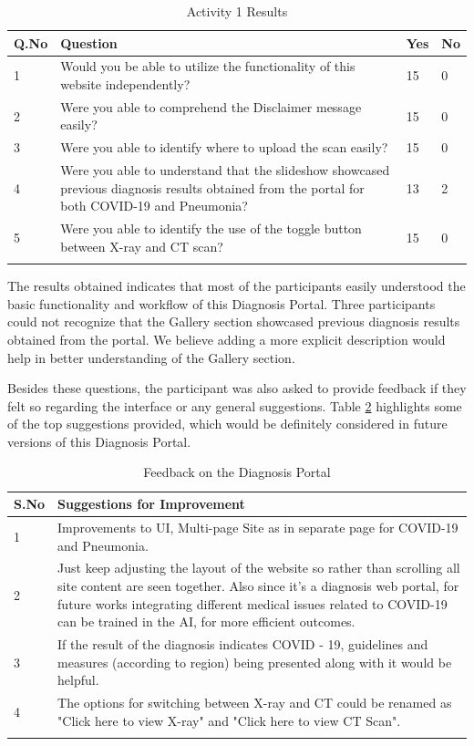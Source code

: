 \begin{longtable}{| p{} | p{} | p{} | p{} |} 
    \hline
    		\textbf{Q.No}    &\textbf{Question} & \textbf{Yes}     & \textbf{No}
\\\hline
            1   &Would you be able to utilize the functionality of this website independently?  &15  &0
\\\hline
            2   &Were you able to comprehend the Disclaimer message easily?  &15  &0
\\\hline
            3   &Were you able to identify where to upload the scan easily?  &15  &0
\\\hline
            4   &Were you able to understand that the slideshow showcased previous diagnosis results obtained from the portal for both COVID-19 and Pneumonia?  &13  &2
\\\hline
            5   &Were you able to identify the use of the toggle button between X-ray and CT scan?  &15  &0
\\\hline

\caption{Activity 1 Results} \label{act:1}
        \end{longtable}

The results obtained indicates that most of the participants easily understood the basic functionality and workflow of this Diagnosis Portal. Three participants could not recognize that the Gallery section showcased previous diagnosis results obtained from the portal. We believe adding a more explicit description would help in better understanding of the Gallery section.

Besides these questions, the participant was also asked to provide feedback if they felt so regarding the interface or any general suggestions. Table \ref{feedback} highlights some of the top suggestions provided, which would be definitely considered in future versions of this Diagnosis Portal.

\vspace{1em}
\begin{longtable}{| p{} | p{} |} 
    \hline
    		\textbf{S.No}    &\textbf{Suggestions for Improvement} 
\\\hline
            1   &Improvements to UI, Multi-page Site as in separate page for COVID-19 and Pneumonia.
\\\hline
            2   &Just keep adjusting the layout of the website so rather than scrolling all site content are seen together. Also since it's a diagnosis web portal, for future works integrating different medical issues related to COVID-19 can be trained in the AI, for more efficient outcomes.
\\\hline
            3   &If the result of the diagnosis indicates COVID - 19, guidelines and measures (according to region) being presented along with it would be helpful.
\\\hline
          4   &The options for switching between X-ray and CT could be renamed as "Click here to view X-ray" and "Click here to view CT Scan".
\\\hline

\caption{Feedback on the Diagnosis Portal} \label{feedback}
        \end{longtable}

